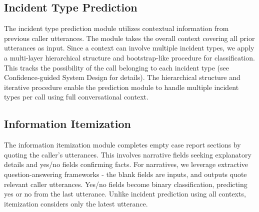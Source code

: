 \subsection{Incident Type Prediction}
\label{subsec:prediction}

The incident type prediction module utilizes contextual information from previous caller utterances. The module takes the overall context covering all prior utterances as input. Since a context can involve multiple incident types, we apply a multi-layer hierarchical structure and bootstrap-like procedure for classification. This tracks the possibility of the call belonging to each incident type (see Confidence-guided System Design for details). The hierarchical structure and iterative procedure enable the prediction module to handle multiple incident types per call using full conversational context.


\subsection{Information Itemization}
\label{subsec:itemization}

The information itemization module completes empty case report sections by quoting the caller's utterances. This involves narrative fields seeking explanatory details and yes/no fields confirming facts. For narratives, we leverage extractive question-answering frameworks - the blank fields are inputs, and outputs quote relevant caller utterances. Yes/no fields become binary classification, predicting yes or no from the last utterance. Unlike incident prediction using all contexts, itemization considers only the latest utterance. 



